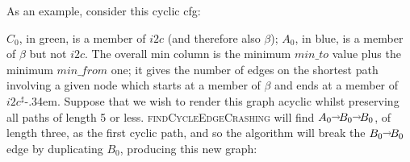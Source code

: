 \noindent
{} As an example, consider this cyclic \gls{cfg}:
\vfill
\centerline{
}
\vfill
\noindent $C_0$, in green, is a member of $i2c$ (and therefore also
$\beta$); $A_0$, in blue, is a member of $\beta$ but not $i2c$.  The
overall min column is the minimum $\mathit{min\_to}$ value plus the
minimum $\mathit{min\_from}$ one; it gives the number of edges on the
shortest path involving a given node which starts at a member of
$\beta$ and ends at a member of $i2c^\sharp$\kern-.34em.  Suppose that we wish to
render this graph acyclic whilst preserving all paths of length 5 or
less.  \textsc{findCycleEdgeCrashing} will find $A_0 \shortrightarrow B_0
\shortrightarrow B_0$, of length three, as the first cyclic path, and so
the algorithm will break the $B_0 \shortrightarrow B_0$ edge by
duplicating $B_0$, producing this new graph:
\vfill
